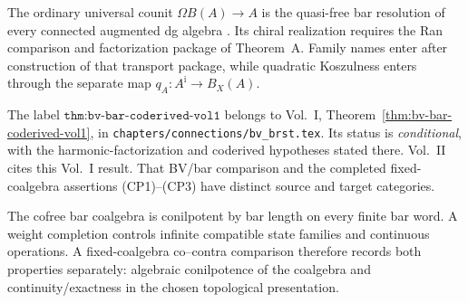 \begin{remark}
\label{rem:theorem-B-chain-level-G-L-attribution}
The ordinary universal counit
\(\Omega B(A)\to A\) is the quasi-free bar resolution of every
connected augmented dg algebra
\cite[Corollary~2.3.4]{LV12}.  Its chiral realization requires the
Ran comparison and factorization package of Theorem~A.  Family names
enter after construction of that transport package, while
quadratic Koszulness enters through the separate map
\(q_A\colon A^{\mathrm i}\to B_X(A)\).

The label \(\texttt{thm:bv-bar-coderived-vol1}\) belongs to Vol.~I,
Theorem~\ref{thm:bv-bar-coderived-vol1}, in
\texttt{chapters/connections/bv\_brst.tex}.  Its status is
\emph{conditional}, with the harmonic-factorization and
coderived hypotheses stated there.  Vol.~II cites this Vol.~I result.
That BV/bar comparison and the completed fixed-coalgebra assertions
\textup{(CP1)--(CP3)} have distinct source and target categories.
\end{remark}

\begin{remark}
\label{rem:class-G-L-survive-raw}
The cofree bar coalgebra is conilpotent by bar length on every finite
bar word.  A weight completion controls infinite compatible state
families and continuous operations.  A fixed-coalgebra co--contra
comparison therefore records both properties separately: algebraic
conilpotence of the coalgebra and continuity/exactness in the chosen
topological presentation.
\end{remark}

